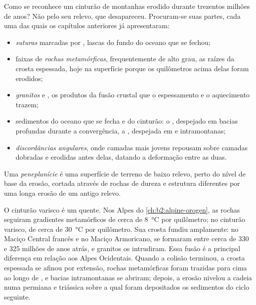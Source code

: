Como se reconhece um cinturão de montanhas erodido durante trezentos milhões de anos?
Não pelo seu relevo, que desapareceu. Procuram-se suas partes, cada uma das quais os capítulos
anteriores já apresentaram:
\begin{itemize}
\item \emph{suturas} marcadas por \emph{}, lascas do fundo do oceano que se fechou;
\item faixas de \emph{rochas metamórficas}, frequentemente de alto grau, as raízes da crosta espessada,
hoje na superfície porque os quilômetros acima delas foram erodidos;
\item \emph{granitos} e \emph{}, os produtos da fusão crustal que o
espessamento e o aquecimento trazem;
\item sedimentos do oceano que se fecha e do cinturão: o \emph{}, despejado em bacias profundas
durante a convergência, a \emph{}, despejada em  e intramontanas;
\item \emph{discordâncias angulares}, onde camadas mais jovens repousam sobre camadas dobradas e
erodidas antes delas, datando a deformação entre as duas.
\end{itemize}

\begin{definition}[Peneplanície]\label{def:b2:wilson-cycle:peneplain}
Uma \emph{peneplanície} é uma superfície de terreno de baixo relevo, perto do nível de base da
erosão, cortada através de rochas de dureza e estrutura diferentes por uma longa erosão de um antigo
relevo.
\end{definition}

O cinturão varisco é um  quente. Nos Alpes do \cref{ch:b2:alpine-orogen}, as rochas
seguiram gradientes metamórficos de cerca de \qty{8}{\celsius} por quilômetro; no cinturão varisco,
de cerca de \qty{30}{\celsius} por quilômetro. Sua crosta fundiu amplamente: no Maciço Central francês
e no Maciço Armoricano,  se formaram entre cerca de 330 e 325 milhões de anos atrás, e
granitos os intrudiram. Essa fusão é a principal diferença em relação aos Alpes Ocidentais. Quando a
colisão terminou, a crosta espessada se afinou por extensão, rochas metamórficas foram trazidas para cima
ao longo de , e bacias intramontanas se abriram; depois, a erosão nivelou a cadeia numa
 permiana e triássica sobre a qual foram depositados os sedimentos do ciclo seguinte.

